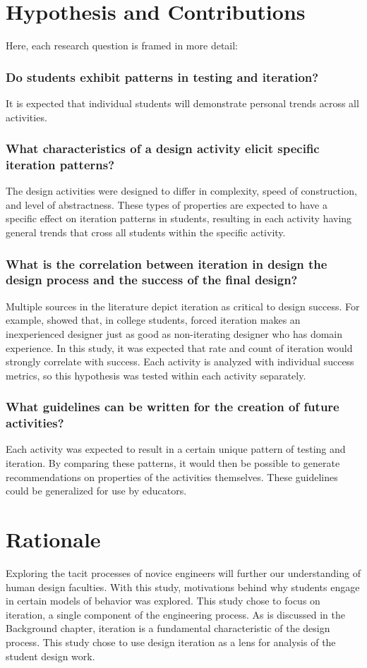 \section{Hypothesis and Contributions}
Here, each research question is framed in more detail:
\subsubsection{Do students exhibit patterns in testing and iteration?}
	It is expected that individual students will demonstrate personal trends across all activities. 
	
\subsubsection{What characteristics of a design activity elicit specific iteration patterns?}
	The design activities were designed to differ in complexity, speed of construction, and level of abstractness. These types of properties are expected to have a specific effect on iteration patterns in students, resulting in each activity having general trends that cross all students within the specific activity.
	
\subsubsection{What is the correlation between iteration in design the design process and the success of the final design?}
	Multiple sources in the literature depict iteration as critical to design success. For example, \citet{dow09} showed that, in college students, forced iteration makes an inexperienced designer just as good as non-iterating designer who has domain experience. In this study, it was expected that rate and count of iteration would strongly correlate with success. Each activity is analyzed with individual success metrics, so this hypothesis was tested within each activity separately. 

\subsubsection{What guidelines can be written for the creation of future activities?}
	Each activity was expected to result in a certain unique pattern of testing and iteration. By comparing these patterns, it would then be possible to generate recommendations on properties of the activities themselves. These guidelines could be generalized for use by educators.

\section{Rationale}
Exploring the tacit processes of novice engineers will further our understanding of human design faculties. With this study, motivations behind why students engage in certain models of behavior was explored. This study chose to focus on iteration, a single component of the engineering process. As is discussed in the Background chapter, iteration is a fundamental characteristic of the design process. This study chose to use design iteration as a lens for analysis of the student design work.
